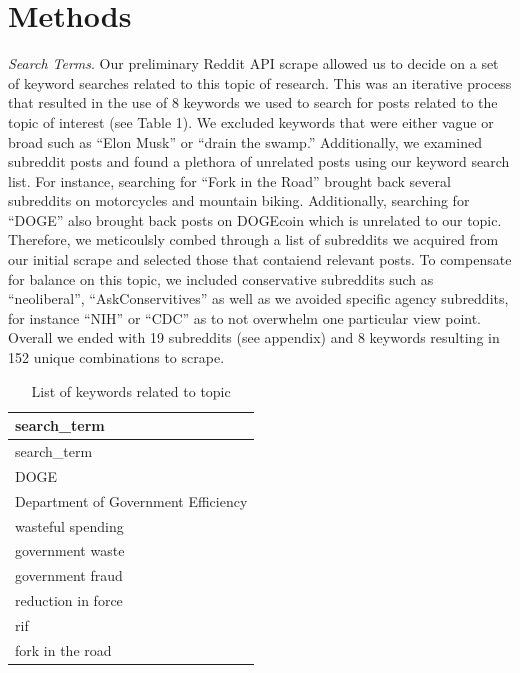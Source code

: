 \documentclass[
  12pt]{article}
\begin{document}
\section{Methods}\label{sec-meth}

\emph{Search Terms}. Our preliminary Reddit API scrape allowed us to
decide on a set of keyword searches related to this topic of research.
This was an iterative process that resulted in the use of 8 keywords we
used to search for posts related to the topic of interest (see Table 1).
We excluded keywords that were either vague or broad such as ``Elon
Musk'' or ``drain the swamp.'' Additionally, we examined subreddit posts
and found a plethora of unrelated posts using our keyword search list.
For instance, searching for ``Fork in the Road'' brought back several
subreddits on motorcycles and mountain biking. Additionally, searching
for ``DOGE'' also brought back posts on DOGEcoin which is unrelated to
our topic. Therefore, we meticoulsly combed through a list of subreddits
we acquired from our initial scrape and selected those that contaiend
relevant posts. To compensate for balance on this topic, we included
conservative subreddits such as ``neoliberal'', ``AskConservitives'' as
well as we avoided specific agency subreddits, for instance ``NIH'' or
``CDC'' as to not overwhelm one particular view point. Overall we ended
with 19 subreddits (see appendix) and 8 keywords resulting in 152 unique
combinations to scrape.

\begin{longtable}[]{@{}l@{}}
\caption{List of keywords related to topic}\tabularnewline
\toprule\noalign{}
search\_term \\
\midrule\noalign{}
\endfirsthead
\toprule\noalign{}
search\_term \\
\midrule\noalign{}
\endhead
\bottomrule\noalign{}
\endlastfoot
DOGE \\
Department of Government Efficiency \\
wasteful spending \\
government waste \\
government fraud \\
reduction in force \\
rif \\
fork in the road \\
\end{longtable}
\end{document}
